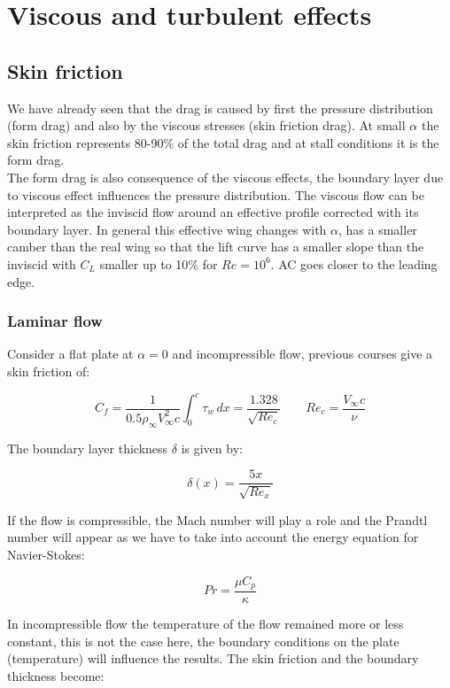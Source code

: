 
\chapter{Viscous and turbulent effects}
\section{Skin friction}
	We have already seen that the drag is caused by first the pressure distribution (form drag) and also by the viscous stresses (skin friction drag). At small $\alpha$ the skin friction represents 80-90\% of the total drag and at stall conditions it is the form drag. \\
	
	The form drag is also consequence of the viscous effects, the boundary layer due to viscous effect influences the pressure distribution. The viscous flow can be interpreted as the inviscid flow around an effective profile corrected with its boundary layer. In general this effective wing changes with $\alpha$, has a smaller camber than the real wing so that the lift curve has a smaller slope than the inviscid with $C_L$ smaller up to 10\%  for $Re = 10^6$. AC goes closer to the leading edge.   	
	
\subsection{Laminar flow}
	Consider a flat plate at $\alpha = 0$ and incompressible flow, previous courses give a skin friction of: 
	
	\begin{equation}
	C_f = \frac{1}{0.5 \rho _\infty V_\infty ^2 c} \int _0^c \tau _w \,dx = \frac{1.328}{\sqrt{Re_c}} \qquad Re_c = \frac{V_\infty c}{\nu}
	\end{equation}
	
	The boundary layer thickness $\delta$ is given by:
	
	\begin{equation}
	\delta (x) = \frac{5x}{\sqrt{Re_x}}
 	\end{equation}
 	
 	If the flow is compressible, the Mach number will play a role and the Prandtl number will appear as we have to take into account the energy equation for Navier-Stokes:
 	
 	\begin{equation}
 	Pr = \frac{\mu C_p}{\kappa}
 	\end{equation}
 	
 	In incompressible flow the temperature of the flow remained more or less constant, this is not the case here, the boundary conditions on the plate (temperature) will influence the results. The skin friction and the boundary thickness become: 
 	
